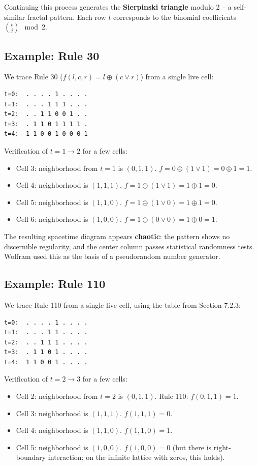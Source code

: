 Continuing this process generates the \textbf{Sierpinski triangle} modulo 2 -- a self-similar fractal pattern. Each row $t$ corresponds to the binomial coefficients $\binom{t}{j} \mod 2$.


\subsection*{Example: Rule 30}

We trace Rule 30 ($f(l,c,r) = l \oplus (c \lor r)$) from a single live cell:

\begin{verbatim}
t=0:  . . . . 1 . . . .
t=1:  . . . 1 1 1 . . .
t=2:  . . 1 1 0 0 1 . .
t=3:  . 1 1 0 1 1 1 1 .
t=4:  1 1 0 0 1 0 0 0 1
\end{verbatim}

Verification of $t = 1 \to 2$ for a few cells:

\begin{itemize}
\item Cell 3: neighborhood from $t=1$ is $(0, 1, 1)$. $f = 0 \oplus (1 \lor 1) = 0 \oplus 1 = 1$.
\item Cell 4: neighborhood is $(1, 1, 1)$. $f = 1 \oplus (1 \lor 1) = 1 \oplus 1 = 0$.
\item Cell 5: neighborhood is $(1, 1, 0)$. $f = 1 \oplus (1 \lor 0) = 1 \oplus 1 = 0$.
\item Cell 6: neighborhood is $(1, 0, 0)$. $f = 1 \oplus (0 \lor 0) = 1 \oplus 0 = 1$.
\end{itemize}

The resulting spacetime diagram appears \textbf{chaotic}: the pattern shows no discernible regularity, and the center column passes statistical randomness tests. Wolfram used this as the basis of a pseudorandom number generator.


\subsection*{Example: Rule 110}

We trace Rule 110 from a single live cell, using the table from Section 7.2.3:

\begin{verbatim}
t=0:  . . . . 1 . . . .
t=1:  . . . 1 1 . . . .
t=2:  . . 1 1 1 . . . .
t=3:  . 1 1 0 1 . . . .
t=4:  1 1 0 0 1 . . . .
\end{verbatim}

Verification of $t = 2 \to 3$ for a few cells:

\begin{itemize}
\item Cell 2: neighborhood from $t=2$ is $(0, 1, 1)$. Rule 110: $f(0,1,1) = 1$.
\item Cell 3: neighborhood is $(1, 1, 1)$. $f(1,1,1) = 0$.
\item Cell 4: neighborhood is $(1, 1, 0)$. $f(1,1,0) = 1$.
\item Cell 5: neighborhood is $(1, 0, 0)$. $f(1,0,0) = 0$ (but there is right-boundary interaction; on the infinite lattice with zeros, this holds).
\end{itemize}

